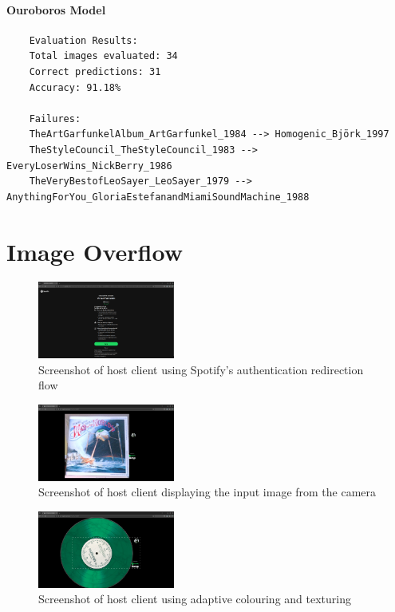 \begin{uomappendix}
                \paragraph{Ouroboros Model}
                \begin{verbatim}
    Evaluation Results:
    Total images evaluated: 34
    Correct predictions: 31
    Accuracy: 91.18%
    
    Failures:
    TheArtGarfunkelAlbum_ArtGarfunkel_1984 --> Homogenic_Björk_1997
    TheStyleCouncil_TheStyleCouncil_1983 --> EveryLoserWins_NickBerry_1986
    TheVeryBestofLeoSayer_LeoSayer_1979 --> AnythingForYou_GloriaEstefanandMiamiSoundMachine_1988
                \end{verbatim}
    
        \section{Image Overflow}
    
            \begin{figure}[h]
                \centering
                \includegraphics[width=0.4\textwidth]{images/screenshots/HOST_Auth.png}
                \caption{Screenshot of host client using Spotify's authentication redirection flow}
                \label{fig:hostAuth}
            \end{figure}
            
            \begin{figure}[h]
                \centering
                \includegraphics[width=0.4\textwidth]{images/screenshots/HOST_Cam.png}
                \caption{Screenshot of host client displaying the input image from the camera}
                \label{fig:hostCam}
            \end{figure}
            
            \begin{figure}[h]
                \centering
                \includegraphics[width=0.4\textwidth]{images/screenshots/HOST_Green.png}
                \caption{Screenshot of host client using adaptive colouring and texturing}
                \label{fig:hostGreen}
            \end{figure}
            

\end{uomappendix}
